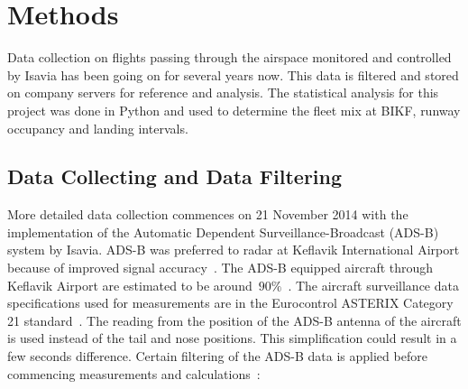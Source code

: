 

\chapter{Methods\label{cha:methods}}
Data collection on flights passing through the airspace monitored and controlled by Isavia has been going on for several years now. This data is filtered and stored on company servers for reference and analysis. The statistical analysis for this project was done in Python and used to determine the fleet mix at BIKF, runway occupancy and landing intervals.

\section{Data Collecting and Data Filtering}
More detailed data collection commences on 21 November 2014 with the implementation of the Automatic Dependent Surveillance-Broadcast (ADS-B) system by Isavia. ADS-B was preferred to radar at Keflavik International Airport because of improved signal accuracy~\cite{isavia_wiki}. The ADS-B equipped aircraft through Keflavik Airport are estimated to be around~$90\%$~\cite{isavia-rounardeild_rannsoknir_2018}. The aircraft surveillance data specifications used for measurements are in the Eurocontrol ASTERIX Category 21 standard~\cite{ASTERIX_ADS-B_specs}.
The reading from the position of the ADS-B antenna of the aircraft is used instead of the tail and nose positions. This simplification could result in a few seconds difference. Certain filtering of the ADS-B data is applied before commencing measurements and calculations~\cite{isavia_wiki}: 
